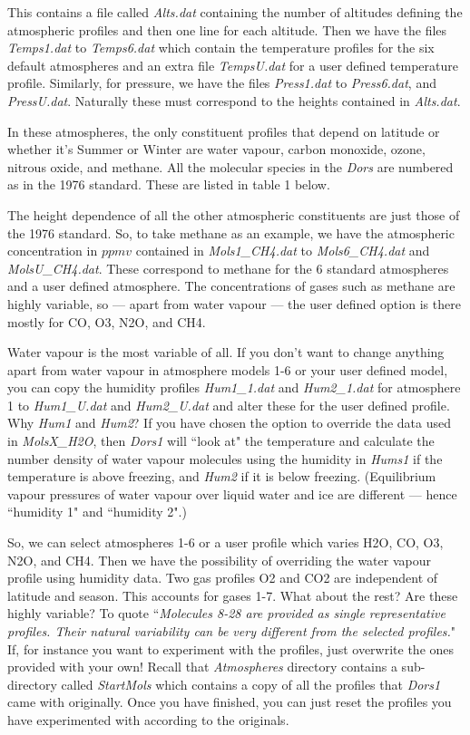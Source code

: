 \documentclass[12pt]{article}
\begin{document}
This contains a file called {\it Alts.dat} containing the number of altitudes defining
the atmospheric profiles and then one line for each altitude. Then we have the files
{\it Temps1.dat} to {\it Temps6.dat} which contain the temperature profiles for the six default atmospheres
and an extra file {\it TempsU.dat} for a user defined temperature profile. Similarly, for pressure,
 we have the files {\it Press1.dat} to {\it Press6.dat}, and {\it PressU.dat}. Naturally these
must correspond to the heights contained in {\it Alts.dat}.

 In these atmospheres, the only constituent profiles that depend on latitude or
whether it's Summer or Winter are water vapour,  carbon monoxide, ozone, nitrous oxide, and methane. 
All the molecular species in the {\it Dors} are numbered as in the 1976 standard. These are listed
in table 1 below.

The height
 dependence of all the other atmospheric constituents are just those of the 1976 standard.
 So, to take methane as an example, we have the atmospheric concentration in $ppmv$ contained
in {\it Mols1\_CH4.dat} to {\it Mols6\_CH4.dat} and {\it MolsU\_CH4.dat}. These correspond to
methane for the 6 standard atmospheres and a user defined atmosphere.
The concentrations of gases such as methane are highly variable, so --- apart from water vapour --- the user defined option
is there mostly for CO, O3, N2O, and CH4. 

Water vapour is the most variable of all. 
If you don't want to change anything apart from water vapour in atmosphere models 1-6 or your
user defined model, 
you can copy the humidity profiles {\it Hum1\_1.dat} and {\it Hum2\_1.dat} for atmosphere 1
 to {\it Hum1\_U.dat} and {\it Hum2\_U.dat} and alter these for the user defined profile.
 Why {\it Hum1} and {\it Hum2}? If you have chosen
the option to override the data used in {\it MolsX\_H2O}, then {\it Dors1} will ``look at" the temperature
and calculate the number density of water vapour molecules using the humidity in {\it Hums1}
 if the temperature is above freezing, and {\it Hum2} if it is below freezing. (Equilibrium vapour pressures
of water vapour over liquid water and ice are different --- hence ``humidity 1" and ``humidity 2".)

So, we can select atmospheres 1-6 or a user profile which varies H2O, CO, O3, N2O, and CH4. 
Then we have the possibility of overriding the water vapour
profile using humidity data.  Two gas profiles O2 and CO2 are independent of latitude and season.
This accounts for gases 1-7. What about the rest? Are these highly variable?
 To quote \cite{ConstProfs:Mybib} ``{\it Molecules 8-28 are provided
as single representative profiles. Their natural variability can be very different from the selected 
profiles.}" If, for instance you want to experiment with the profiles, just overwrite the ones provided
with your own! Recall that {\it Atmospheres} directory contains a sub-directory called {\it StartMols} which  contains
a copy of all the profiles that {\it Dors1} came with originally. Once you have finished, you can just reset 
 the profiles you have experimented with according to the originals. 
\end{document}

